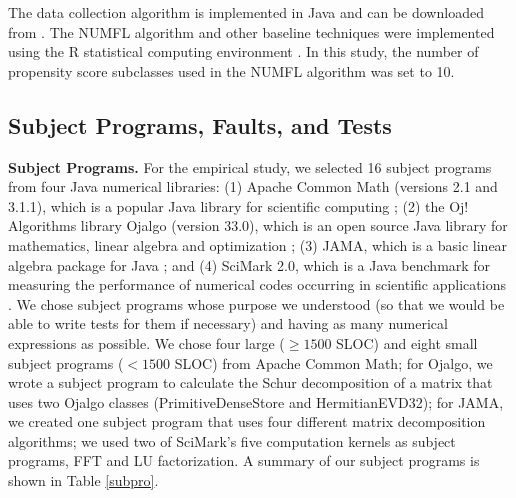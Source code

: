 \documentclass[times]{stvrauth}
\begin{document}
The data collection algorithm is implemented in Java and can be downloaded from \cite{NUMFL}.  The NUMFL algorithm and other baseline techniques were implemented using the R statistical computing environment \cite{R}. In this study, the number of propensity score subclasses used in the NUMFL algorithm was set to 10.


\subsection{Subject Programs, Faults, and Tests}
{\bf Subject Programs.}  For the empirical study, we selected 16 subject programs from four Java numerical libraries: (1) Apache Common Math (versions 2.1 and 3.1.1), which is a popular Java library for scientific computing \cite{Commons}; (2) the Oj! Algorithms library Ojalgo (version 33.0), which is an open source Java library for mathematics, linear algebra and optimization \cite{Oj}; (3) JAMA, which is a basic linear algebra package for Java \cite{JAMA}; and (4) SciMark 2.0, which is a Java benchmark for measuring the performance of numerical codes occurring in scientific applications \cite{SciMark}.  We chose subject programs whose purpose we understood (so that we would be able to write tests for them if necessary) and having as many numerical expressions as possible.  We chose four large ($\ge 1500$ SLOC) and eight small subject programs ($< 1500$ SLOC) from Apache Common Math; for Ojalgo, we wrote a subject program to calculate the Schur decomposition of a matrix that uses two Ojalgo classes (PrimitiveDenseStore and HermitianEVD32); for JAMA, we created one subject program that uses four different matrix decomposition algorithms; we used two of SciMark's five computation kernels as subject programs, FFT and LU factorization.  A summary of our subject programs is shown in Table \ref{subpro}.
\end{document}
